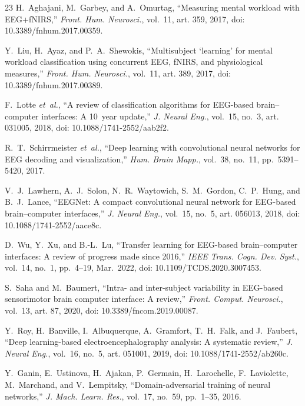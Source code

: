\documentclass[conference]{IEEEtran}
\begin{document}
\begin{thebibliography}{23}
H.~Aghajani, M.~Garbey, and A.~Omurtag, ``Measuring mental workload with EEG+fNIRS,'' \textit{Front. Hum. Neurosci.}, vol.~11, art. 359, 2017, doi: 10.3389/fnhum.2017.00359.

Y.~Liu, H.~Ayaz, and P.~A.~Shewokis, ``Multisubject `learning' for mental workload classification using concurrent EEG, fNIRS, and physiological measures,'' \textit{Front. Hum. Neurosci.}, vol.~11, art. 389, 2017, doi: 10.3389/fnhum.2017.00389.

F.~Lotte \textit{et~al.}, ``A review of classification algorithms for EEG-based brain--computer interfaces: A 10~year update,'' \textit{J. Neural Eng.}, vol.~15, no.~3, art. 031005, 2018, doi: 10.1088/1741-2552/aab2f2.

R.~T.~Schirrmeister \textit{et~al.}, ``Deep learning with convolutional neural networks for EEG decoding and visualization,'' \textit{Hum. Brain Mapp.}, vol.~38, no.~11, pp.~5391--5420, 2017.

V.~J.~Lawhern, A.~J.~Solon, N.~R.~Waytowich, S.~M.~Gordon, C.~P.~Hung, and B.~J.~Lance, ``EEGNet: A compact convolutional neural network for EEG-based brain--computer interfaces,'' \textit{J. Neural Eng.}, vol.~15, no.~5, art. 056013, 2018, doi: 10.1088/1741-2552/aace8c.

D.~Wu, Y.~Xu, and B.-L.~Lu, ``Transfer learning for EEG-based brain--computer interfaces: A review of progress made since 2016,'' \textit{IEEE Trans. Cogn. Dev. Syst.}, vol.~14, no.~1, pp.~4--19, Mar.\ 2022, doi: 10.1109/TCDS.2020.3007453.

S.~Saha and M.~Baumert, ``Intra- and inter-subject variability in EEG-based sensorimotor brain computer interface: A review,'' \textit{Front. Comput. Neurosci.}, vol.~13, art. 87, 2020, doi: 10.3389/fncom.2019.00087.

Y.~Roy, H.~Banville, I.~Albuquerque, A.~Gramfort, T.~H.~Falk, and J.~Faubert, ``Deep learning-based electroencephalography analysis: A systematic review,'' \textit{J. Neural Eng.}, vol.~16, no.~5, art. 051001, 2019, doi: 10.1088/1741-2552/ab260c.

Y.~Ganin, E.~Ustinova, H.~Ajakan, P.~Germain, H.~Larochelle, F.~Laviolette, M.~Marchand, and V.~Lempitsky, ``Domain-adversarial training of neural networks,'' \textit{J. Mach. Learn. Res.}, vol.~17, no.~59, pp.~1--35, 2016.


\end{thebibliography}
\end{document}
